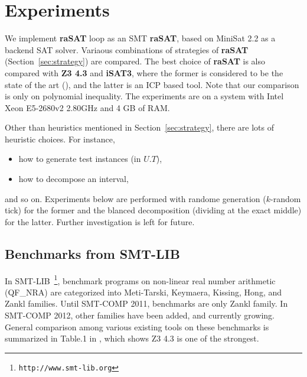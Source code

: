 \documentclass[runningheads,a4paper,oribibl]{llncs}
\begin{document}
\section{Experiments} \label{sec:experiment}


We implement \textbf{raSAT} loop as an SMT {\bf raSAT}, 
based on MiniSat 2.2 as a backend SAT solver. 
Variaous combinations of strategies of {\bf raSAT} (Section~\ref{sec:strategy})
are compared. 
The best choice of {\bf raSAT} is also compared with \textbf{Z3 4.3} and \textbf{iSAT3}, 
where the former is considered to be the state of the art (\cite{Jovanovic13}), and 
the latter is an ICP based tool. 
Note that our comparison is only on polynomial inequality. 
The experiments are on a system with Intel Xeon E5-2680v2 2.80GHz and 4 GB of RAM. 

Other than heuristics mentioned in Section~\ref{sec:strategy}, 
there are lots of heuristic choices. 
For instance, 
\begin{itemize}
\item how to generate test instances (in $U.T$), 
\item how to decompose an interval, 
\end{itemize} 
and so on. 
Experiments below %
are performed 
with randome generation ($k$-random tick) for the former and the blanced decomposition 
(dividing at the exact middle) for the latter. 
Further investigation is left for future. 


\subsection{Benchmarks from SMT-LIB} \label{sec:expsmtlib}

In SMT-LIB~\footnote{\tt http://www.smt-lib.org}, 
benchmark programs on non-linear real number arithmetic 
(QF\_NRA) are categorized into Meti-Tarski, Keymaera, Kissing, Hong, and Zankl families. 
Until SMT-COMP 2011, benchmarks are only Zankl family. 
In SMT-COMP 2012, other families have been added, and currently growing. 
General comparison among various existing tools on these benchmarks is summarized in 
Table.1 in \cite{Jovanovic13}, which shows Z3 4.3 is one of the strongest. 
\end{document}
